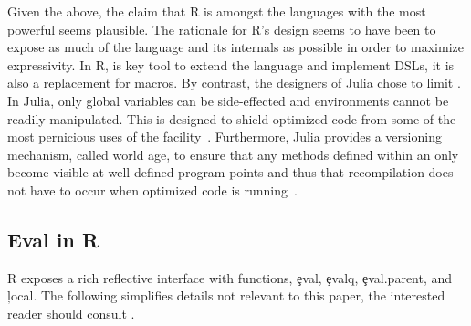 \documentclass[screen,acmsmall]{acmart}
\begin{document}
Given the above, the claim that R is amongst the languages with the most
powerful \eval seems plausible. The rationale for R's design seems to have been
to expose as much of the language and its internals as possible in order to
maximize expressivity. In R, \eval is key tool to extend the language and
implement DSLs, it is also a replacement for macros. By contrast, the designers
of Julia chose to limit \eval. In Julia, only global variables can be
side-effected and environments cannot be readily manipulated. This is designed
to shield optimized code from some of the most pernicious uses of the
facility~\cite{oopsla18a}. Furthermore, Julia provides a versioning
mechanism, called world age, to ensure that any methods defined within an \eval
only become visible at well-defined program points and thus that recompilation
does not have to occur when optimized code is running~\cite{oopsla20a}.

\subsection{Eval in R}

R exposes a rich reflective interface with functions, \c{eval},
\c{evalq}, \c{eval.parent}, and \c{local}. The following simplifies details not
relevant to this paper, the interested reader should consult \citet{hadley}.
\end{document}
